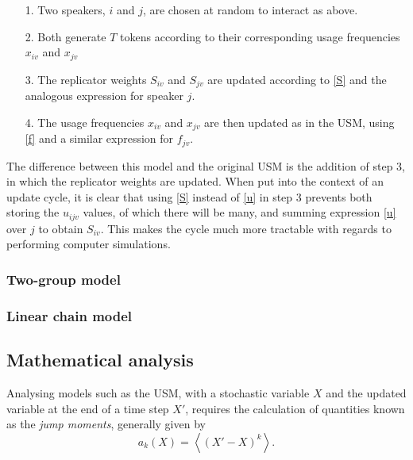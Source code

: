 \documentclass[12pt]{article}
\begin{document}
\begin{itemize}
\item[1.] Two speakers, $i$ and $j$, are chosen at random to interact as above.
\item[2.] Both generate $T$ tokens according to their corresponding usage frequencies $x_{iv}$ and $x_{jv}$
\item[3.] The replicator weights $S_{iv}$ and $S_{jv}$ are updated according to \eqref{S} and the analogous expression for speaker $j$.
\item[4.] The usage frequencies $x_{iv}$ and $x_{jv}$ are then updated as in the USM, using \eqref{f} and a similar expression for $f_{jv}$.
\end{itemize}
The difference between this model and the original USM is the addition of step 3, in which the replicator weights are updated. When put into the context of an update cycle, it is clear that using \eqref{S} instead of \eqref{u} in step 3 prevents both storing the $u_{ijv}$ values, of which there will be many, and summing expression \eqref{u} over $j$ to obtain $S_{iv}$. This makes the cycle much more tractable with regards to performing computer simulations.

\subsubsection{Two-group model}
\subsubsection{Linear chain model}

\subsection{Mathematical analysis}
Analysing models such as the USM, with a stochastic variable $X$ and the updated variable at the end of a time step $X'$, requires the calculation of quantities known as the \emph{jump moments}, generally given by
\begin{equation}\label{a}
a_k(X) = \left\langle \left(X' - X \right)^k \right\rangle.
\end{equation}
\end{document}
